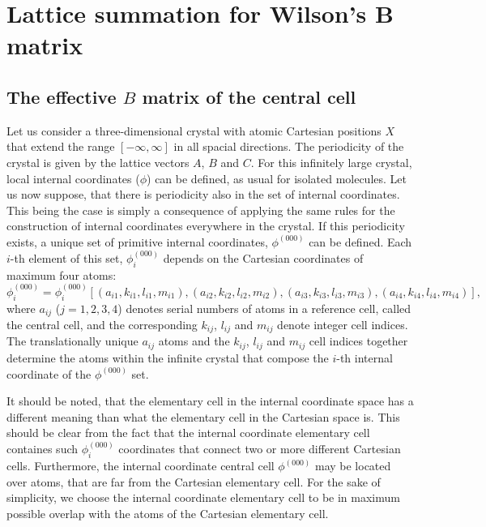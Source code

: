 \documentclass[prl,aps,preprint,superbib,12pt]{revtex4}
\begin{document}
\section{Lattice summation for Wilson's B matrix}
\subsection{The effective $B$ matrix of the central cell}
Let us consider a three-dimensional crystal with atomic 
Cartesian positions $X$ that extend the range $[-\infty,\infty]$
in all spacial directions. The periodicity of the crystal
is given by the lattice vectors $A$, $B$ and $C$.
For this infinitely large crystal, local internal coordinates ($\phi$) 
can be defined, as usual for isolated molecules. Let us now suppose,
that there is periodicity also in the set of internal coordinates.
This being the case is simply a consequence of applying the 
same rules for the 
construction of internal coordinates everywhere in the crystal.
If this periodicity exists, a unique set of primitive internal 
coordinates, $\phi^{(000)}$ can be defined. Each $i$-th element of this
set, $\phi^{(000)}_{i}$ depends on the Cartesian coordinates of
maximum four atoms: 
\begin{equation}
\phi^{(000)}_{i}=\phi^{(000)}_{i}[
(a_{i1},k_{i1},l_{i1},m_{i1}),
(a_{i2},k_{i2},l_{i2},m_{i2}),
(a_{i3},k_{i3},l_{i3},m_{i3}),
(a_{i4},k_{i4},l_{i4},m_{i4})],
\end{equation}
where $a_{ij}$ ($j=1,2,3,4$) denotes serial numbers of atoms in 
a reference cell, called the 
central cell, and the corresponding $k_{ij}$, $l_{ij}$ and $m_{ij}$ 
denote integer cell indices.
The translationally unique $a_{ij}$ atoms and the 
$k_{ij}$, $l_{ij}$ and $m_{ij}$ 
cell indices together determine
the atoms within the infinite crystal that compose 
the $i$-th internal coordinate of the $\phi^{(000)}$ set. 

It should be noted, that the elementary cell in the
internal coordinate space has a different meaning than what 
the elementary cell in the Cartesian space is. This should
be clear from the fact that the internal coordinate elementary cell 
containes such $\phi^{(000)}_{i}$ coordinates that connect
two or more different Cartesian cells. Furthermore, the internal
coordinate central cell $\phi^{(000)}$ may be located over atoms, 
that are far
from the Cartesian elementary cell. For the sake of simplicity,
we choose the internal coordinate elementary cell to be in maximum
possible overlap with the atoms of the Cartesian elementary cell.
\end{document}
